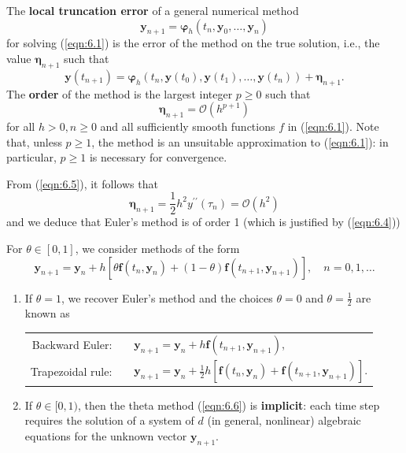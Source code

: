 \documentclass[a4paper]{article}
\begin{document}
\begin{definition}
    The \textbf{local truncation error} of a general numerical method 
    \[
        \mathbf{y}_{n+1}=\boldsymbol{\varphi}_h\left(t_n, \mathbf{y}_0, \ldots, \mathbf{y}_n\right)
    \]
    for solving (\ref{eqn:6.1}) is the error of the method on the true solution, i.e., the value $\boldsymbol{\eta}_{n+1}$ such that
\[
\mathbf{y}\left(t_{n+1}\right)=\boldsymbol{\varphi}_h\left(t_n, \mathbf{y}\left(t_0\right), \mathbf{y}\left(t_1\right), \ldots, \mathbf{y}\left(t_n\right)\right)+\mathbf{\boldsymbol{\eta}}_{n+1} .
\]
The \textbf{order} of the method is the largest integer $p \geq 0$ such that
\[
\boldsymbol{\eta}_{n+1}=\mathcal{O}\left(h^{p+1}\right)
\]
for all $h>0, n \geq 0$ and all sufficiently smooth functions $f$ in (\ref{eqn:6.1}). Note that, unless $p \geq 1$, the method is an unsuitable approximation to (\ref{eqn:6.1}): in particular, $p \geq 1$ is necessary for convergence.
\end{definition}

\begin{remark}
    From (\ref{eqn:6.5}), it follows that
\[
\boldsymbol{\eta}_{n+1}=\frac{1}{2} h^2 y^{\prime \prime}\left(\tau_n\right)=\mathcal{O}\left(h^2\right)
\]
and we deduce that Euler's method is of order 1 (which is justified by (\ref{eqn:6.4}))
\end{remark}

\begin{definition}
    For $\theta \in[0,1]$, we consider methods of the form
\begin{equation}\label{eqn:6.6}
    \mathbf{y}_{n+1}=\mathbf{y}_n+h\left[\theta \mathbf{f}\left(t_n, \mathbf{y}_n\right)+(1-\theta) \mathbf{f}\left(t_{n+1}, \mathbf{y}_{n+1}\right)\right], \quad n=0,1, \ldots
\end{equation}
\begin{enumerate}[(1)]
    \item If $\theta=1$, we recover Euler's method and the choices $\theta=0$ and $\theta=\frac{1}{2}$ are known as
    \begin{center}
    \begin{tabular}{rl}
        Backward Euler: & $\quad \mathbf{y}_{n+1}=\mathbf{y}_n+h \mathbf{f}\left(t_{n+1}, \mathbf{y}_{n+1}\right)$,\\[.5em]
        Trapezoidal rule: & $\quad \mathbf{y}_{n+1}=\mathbf{y}_n+\frac{1}{2} h\left[\mathbf{f}\left(t_n, \mathbf{y}_n\right)+\mathbf{f}\left(t_{n+1}, \mathbf{y}_{n+1}\right)\right]$.
    \end{tabular}
    \end{center}
    \item If $\theta \in[0,1)$, then the theta method (\ref{eqn:6.6}) is \textbf{implicit}: each time step requires the solution of a system of $d$ (in general, nonlinear) algebraic equations for the unknown vector $\mathbf{y}_{n+1}$.
\end{enumerate}
\end{definition}
\end{document}
